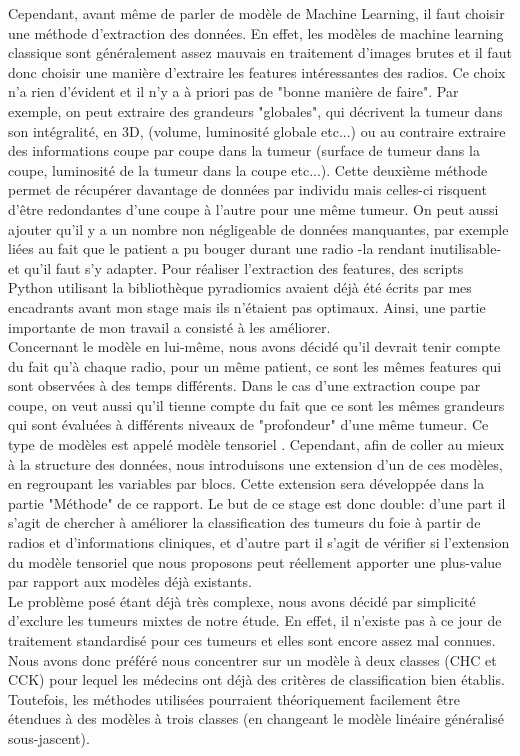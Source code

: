 \documentclass[10pt]{article}
\begin{document}
\indent  Cependant, avant même de parler de modèle de Machine Learning, il faut choisir une méthode d'extraction des données. En effet, les modèles de machine learning classique sont généralement assez mauvais en traitement d'images brutes et il faut donc choisir une manière d'extraire les features intéressantes des radios. Ce choix n'a rien d'évident et il n'y a à priori pas de "bonne manière de faire". Par exemple, on peut extraire des grandeurs "globales", qui décrivent la tumeur dans son intégralité, en 3D, (volume, luminosité globale etc...) ou au contraire extraire des informations coupe par coupe dans la tumeur (surface de tumeur dans la coupe, luminosité de la tumeur dans la coupe etc...). Cette deuxième méthode permet de récupérer davantage de données par individu mais celles-ci risquent d'être redondantes d'une coupe à l'autre pour une même tumeur. On peut aussi ajouter qu'il y a un nombre non négligeable de données manquantes, par exemple liées au fait que le patient a pu bouger durant une radio -la rendant inutilisable- et qu'il faut s'y adapter. Pour réaliser l'extraction des features, des scripts Python utilisant la bibliothèque pyradiomics \cite{pyradio} avaient déjà été écrits par mes encadrants avant mon stage mais ils n'étaient pas optimaux. Ainsi, une partie importante de mon travail a consisté à les améliorer.\\
\indent Concernant le modèle en lui-même, nous avons décidé qu'il devrait tenir compte du fait qu'à chaque radio, pour un même patient, ce sont les mêmes features qui sont observées à des temps différents.  Dans le cas d'une extraction coupe par coupe, on veut aussi qu'il tienne compte du fait que ce sont les mêmes grandeurs qui sont évaluées à différents niveaux de "profondeur" d'une même tumeur. Ce type de modèles est appelé modèle tensoriel \cite{multi_rank_1,multi_rank_r}. Cependant, afin de coller au mieux à la structure des données, nous introduisons une extension d'un de ces modèles, en regroupant les variables par blocs. Cette extension sera développée dans la partie "Méthode" de ce rapport. Le but de ce stage est donc double: d'une part il s'agit de chercher à améliorer la classification des tumeurs du foie à partir de radios et d'informations cliniques, et d'autre part il s'agit de vérifier si l'extension du modèle tensoriel que nous proposons peut réellement apporter une plus-value par rapport aux modèles déjà existants.\\
\indent Le problème posé étant déjà très complexe, nous avons décidé par simplicité d'exclure les tumeurs mixtes de notre étude. En effet, il n'existe pas à ce jour de traitement standardisé pour ces tumeurs et elles sont encore assez mal connues. Nous avons donc préféré nous concentrer sur un modèle à deux classes (CHC et CCK) pour lequel les médecins ont déjà des critères de classification bien établis. Toutefois, les méthodes utilisées pourraient théoriquement facilement être étendues à des modèles à trois classes (en changeant le modèle linéaire généralisé sous-jascent).\\
\end{document}
